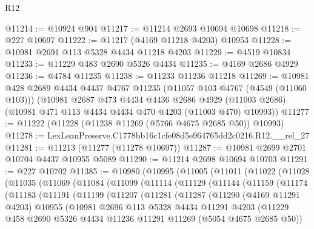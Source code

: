\begin{lexlean}{R12}
\begin{coremodule}
@11214 := @10924 @904
@11217 := @11214 @2693 @10694 @10698
@11218 := @227 @10697
@11222 := @11217 (@4169 @11218 @4203) @10953
@11228 := @10981 @2691 @113 @5328 @4434 @11218 @4203
@11229 := @4519 @10834
@11233 := @11229 @483 @2690 @5326 @4434
@11235 := @4169 @2686 @4929
@11236 := @4784 @11235
@11238 := @11233 @11236 @11218
@11269 := @10981
    @428
    @2689
    @4434
    @4437
    @4767
    @11235
    (@11057 @103 @4767 (@4549 (@11060 @103)))
    (@10981
      @2687
      @473
      @4434
      @4436
      @2686
      @4929
      (@11003 @2686)
      (@10981 @471 @113 @4434 @4434 @470 @4203 (@11003 @470) @10993))
@11277 := @11222 (@11228 (@11238 @11269 (@5766 @4675 @2685 @50)) @10993)
@11278 := LexLeanPreserve.C1778bb16c1cfe08d5e964765dd2c0216.R12.__rel_27
@11281 := @11213 (@11277 (@11278 @10697))
@11287 := @10981 @2699 @2701 @10704 @4437 @10955 @5089
@11290 := @11214 @2698 @10694 @10703
@11291 := @227 @10702
@11385 := @10980
    (@10995
      (@11005
        (@11011
          (@11022
            (@11028
              (@11035
                (@11069
                  (@11084
                    (@11099
                      (@11114
                        (@11129
                          (@11144
                            (@11159
                              (@11174
                                (@11183
                                  (@11191
                                    (@11199
                                      (@11207
                                        (@11281
                                          (@11287
                                            (@11290
                                              (@4169 @11291 @4203)
                                              @10955
                                              (@10981
                                                @2696
                                                @113
                                                @5328
                                                @4434
                                                @11291
                                                @4203
                                                (@11229
                                                  @458
                                                  @2690
                                                  @5326
                                                  @4434
                                                  @11236
                                                  @11291
                                                  @11269
                                                  (@5054 @4675 @2685 @50))

\end{coremodule}
\end{lexlean}
